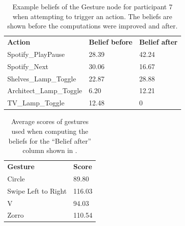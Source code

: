 \begin{table}[]
\centering
\caption{Example beliefs of the Gesture node for participant 7 when attempting to trigger an action. The beliefs are shown before the computations were improved and after.}
\label{sec:evaluation:alternative-models:improved-action-beliefs}
\begin{tabular}{lll}
\textbf{Action}         & \textbf{Belief before} & \textbf{Belief after} \\
Spotify\_PlayPause      & 28.39                                              & 42.24                                             \\
Spotify\_Next           & 30.06                                              & 16.67                                             \\
Shelves\_Lamp\_Toggle   & 22.87                                              & 28.88                                             \\
Architect\_Lamp\_Toggle & 6.20                                               & 12.21                                             \\
TV\_Lamp\_Toggle        & 12.48                                              & 0                                                 
\end{tabular}
\end{table}

\begin{table}[]
\centering
\caption{Average scores of gestures used when computing the beliefs for the ``Belief after'' column shown in .}
\label{sec:evaluation:alternative-models:improved-gesture-beliefs}
\begin{tabular}{ll}
\textbf{Gesture}    & \textbf{Score} \\
Circle              & 89.80          \\
Swipe Left to Right & 116.03         \\
V                   & 94.03          \\
Zorro               & 110.54         
\end{tabular}
\end{table}

